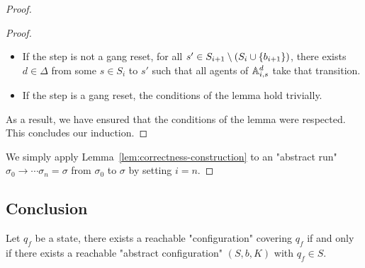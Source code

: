 \begin{proof}
\begin{proof}
\begin{itemize}
		\item If the step is not a gang reset, for all $s' \in S_{i+1} \setminus (S_i \cup \{b_{i+1}\})$, there exists $d \in \Delta$ from some $s \in S_i$ to $s'$ such that all agents of $\mathbb{A}_{i,s}^d$ take that transition.
		
		\item If the step is a gang reset, the conditions of the lemma hold trivially.
	\end{itemize}
	
	As a result, we have ensured that the conditions of the lemma were respected.
	This concludes our induction.
\end{proof}
\fi

	We simply apply Lemma~\ref{lem:correctness-construction} to an "abstract run" $\sigma_0 \to \cdots \sigma_n = \sigma$ from $\sigma_0$ to $\sigma$ by setting $i = n$.
\end{proof}
\fi

\subsection{Conclusion}


\begin{proposition}
	\label{prop:sound-and-complete}
	Let $q_f$ be a state, there exists a reachable "configuration" covering $q_f$ if and only if there exists a reachable "abstract configuration" $(S,b,K)$ with $q_f \in S$.
\end{proposition}

